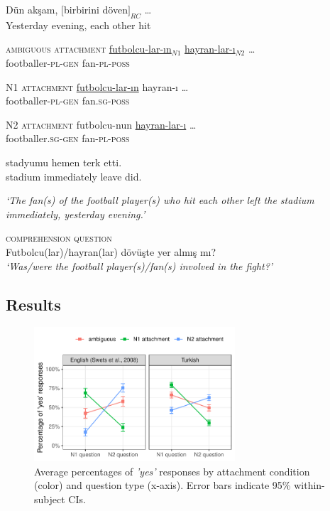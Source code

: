 \documentclass[11pt]{article}\usepackage[]{graphicx}\usepackage[]{color}
\begin{document}
\begin{exe}
\ex \label{TREx} \gll Dün akşam, $[$birbirini döven$]_{RC}$ \ldots \\
Yesterday evening, {each other} hit  \\
\begin{xlist} 
\item{}\textsc{ambiguous attachment}{} 
\gll \uline{futbolcu-lar-ın}$_{N1}$ \uline{hayran-lar-ı}$_{N2}$ {\ldots} \\
     {footballer}-\textsc{pl}-\textsc{gen} fan-\textsc{pl}-\textsc{poss} {} \\

\item{}\textsc{N1 attachment}{} 
\gll \uline{futbolcu-lar-ın} hayran-ı  {\ldots} \\
    {footballer}-\textsc{pl}-\textsc{gen} fan.\textsc{sg}-\textsc{poss}  {} \\

\item{}\textsc{N2 attachment}{} 
\gll futbolcu-nun \uline{hayran-lar-ı}  {\ldots}\\
    {footballer}.\textsc{sg}-\textsc{gen} fan-\textsc{pl}-\textsc{poss}  {} \\

\item[] \gll {\ldots} stadyumu hemen terk etti. \\
            {}       stadium  immediately leave did. \\
\end{xlist}
\textit{`The fan(s) of the football player(s) who hit each other left the stadium immediately, yesterday evening.'}
\end{exe}

\begin{exe}
\ex \label{TRQuestion}  \textsc{comprehension question} \\ 
 Futbolcu(lar)/hayran(lar) dövüşte yer almış mı? \\
    \textit{`Was/were the football player(s)/fan(s) involved in the fight?'} \\
\end{exe}

\subsection{Results}

\begin{figure}[h]
\includegraphics[width=7.5cm]{./figures/avg_perc.pdf}
\caption{Average percentages of \textit{'yes'} responses by attachment condition (color) and question type (x-axis). Error bars indicate 95\% within-subject CIs.}
\label{avg_perc}
\end{figure}
\end{document}
